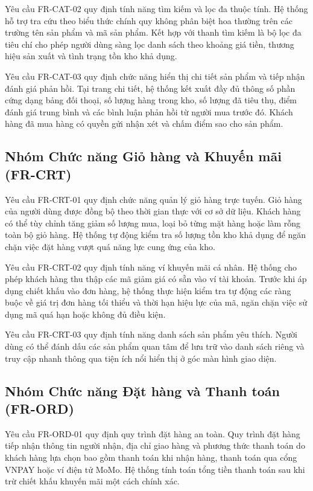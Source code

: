 Yêu cầu FR-CAT-02 quy định tính năng tìm kiếm và lọc đa thuộc tính. Hệ thống hỗ trợ tra cứu theo biểu thức chính quy không phân biệt hoa thường trên các trường tên sản phẩm và mã sản phẩm. Kết hợp với thanh tìm kiếm là bộ lọc đa tiêu chí cho phép người dùng sàng lọc danh sách theo khoảng giá tiền, thương hiệu sản xuất và tình trạng tồn kho khả dụng.

Yêu cầu FR-CAT-03 quy định chức năng hiển thị chi tiết sản phẩm và tiếp nhận đánh giá phản hồi. Tại trang chi tiết, hệ thống kết xuất đầy đủ thông số phần cứng dạng bảng đối thoại, số lượng hàng trong kho, số lượng đã tiêu thụ, điểm đánh giá trung bình và các bình luận phản hồi từ người mua trước đó. Khách hàng đã mua hàng có quyền gửi nhận xét và chấm điểm sao cho sản phẩm.

\subsection{Nhóm Chức năng Giỏ hàng và Khuyến mãi (FR-CRT)}
Yêu cầu FR-CRT-01 quy định chức năng quản lý giỏ hàng trực tuyến. Giỏ hàng của người dùng được đồng bộ theo thời gian thực với cơ sở dữ liệu. Khách hàng có thể tùy chỉnh tăng giảm số lượng mua, loại bỏ từng mặt hàng hoặc làm rỗng toàn bộ giỏ hàng. Hệ thống tự động kiểm tra số lượng tồn kho khả dụng để ngăn chặn việc đặt hàng vượt quá năng lực cung ứng của kho.

Yêu cầu FR-CRT-02 quy định tính năng ví khuyến mãi cá nhân. Hệ thống cho phép khách hàng thu thập các mã giảm giá có sẵn vào ví tài khoản. Trước khi áp dụng chiết khấu vào đơn hàng, hệ thống thực hiện kiểm tra tự động các ràng buộc về giá trị đơn hàng tối thiểu và thời hạn hiệu lực của mã, ngăn chặn việc sử dụng mã quá hạn hoặc không đủ điều kiện.

Yêu cầu FR-CRT-03 quy định tính năng danh sách sản phẩm yêu thích. Người dùng có thể đánh dấu các sản phẩm quan tâm để lưu trữ vào danh sách riêng và truy cập nhanh thông qua tiện ích nổi hiển thị ở góc màn hình giao diện.

\subsection{Nhóm Chức năng Đặt hàng và Thanh toán (FR-ORD)}
Yêu cầu FR-ORD-01 quy định quy trình đặt hàng an toàn. Quy trình đặt hàng tiếp nhận thông tin người nhận, địa chỉ giao hàng và phương thức thanh toán do khách hàng lựa chọn bao gồm thanh toán khi nhận hàng, thanh toán qua cổng VNPAY hoặc ví điện tử MoMo. Hệ thống tính toán tổng tiền thanh toán sau khi trừ chiết khấu khuyến mãi một cách chính xác.

